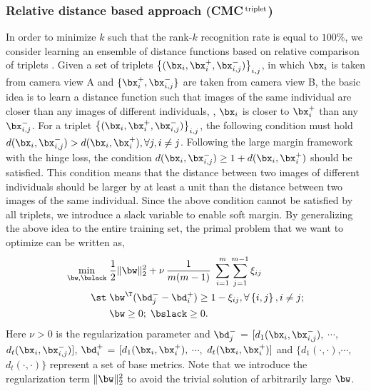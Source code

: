 \documentclass[10pt,twocolumn,letterpaper]{article}
\def\bxi{{\bx_i}}
\def\bxip{{\bx_i^{+}}}
\def\bxijm{{\bx_{i,j}^{-}}}
\def\bdip{{\bd_{i}^{+}}}
\def\bdjm{{\bd_{j}^{-}}}
\def\CMCtriplet{{\rm CMC$^{\,\rm triplet}$}\xspace}
\begin{document}
\subsubsection{Relative distance based approach (\CMCtriplet)}
%
%
In order to minimize $k$ such that the rank-$k$ recognition rate
is equal to $100\%$,
we consider learning an ensemble of distance
functions based on relative comparison of triplets \cite{Schultz2004Learning}.
Given a set of triplets
$\left\{(\bxi, \bxip, \bxijm) \right\}_{i,j}$,
in which $\bxi$ is taken from camera view A and
$\{ \bxip, \bxijm \}$ are taken from camera view B,
the basic idea is to learn
a distance function such that
images of the same individual are closer than any images of
different individuals, \ie, $\bxi$ is closer to $\bxip$  than any $\bxijm$.
For a triplet $\left\{ (\bxi, \bxip, \bxijm) \right\}_{i,j}$, the following condition
must hold $d(\bxi,\bxijm) > d(\bxi,\bxip), \forall j, i \neq j$.
Following the large margin framework with the hinge loss, the condition
$d(\bxi,\bxijm) \geq 1 + d(\bxi,\bxip)$ should be satisfied.
This condition means that the distance between two images of
different individuals should be
larger by at least a unit than
the distance between two images of the
same individual.
Since the above condition cannot be satisfied by all triplets,
we introduce a slack variable to enable soft margin.
By generalizing the above idea to the entire training set,
the primal problem that we want to optimize can be written as,
%
%
\begin{align}
    \label{EQ:svm}
        \min_{ \bw, \bslack }   \;
        &
         \frac{1}{2} \| \bw  \|_{2}^{2} + \nu \, \frac{1}{m(m-1)} \;
                                \sum_{i=1}^m \sum_{j=1}^{m-1} \xi_{ij}   \\ \notag
        \st \; &
        \bw^\T ( \bdjm - \bdip ) \geq 1 - \xi_{ij}, \forall \left\{i,j\right\}, i \neq j ;
            \\ \notag
        \; &
        \bw \geq 0; \; \bslack \geq 0.
\end{align}
%
%
Here $\nu > 0$ is the regularization parameter and
$\bdjm$ = $[d_1(\bxi,\bxijm),$ $\cdots,$ $d_t(\bxi,\bxijm)]$,
$\bdip$ = $[d_1(\bxi,\bxip),$ $\cdots,$ $d_t(\bxi,\bxip)]$ and
$\{d_1(\cdot,\cdot)$,$\cdots$,$d_t(\cdot,\cdot)\}$ represent
a set of base metrics.
%
%
Note that we introduce the regularization term $\| \bw \|_{2}^2$ to avoid the trivial solution
of arbitrarily large $\bw$.
%
\end{document}
